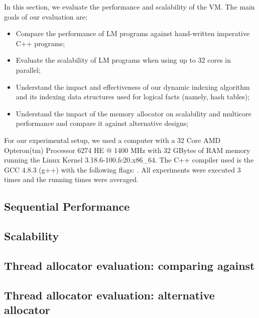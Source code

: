 In this section, we evaluate the performance and scalability of the VM. The main
goals of our evaluation are:

\begin{itemize}
   \item Compare the performance of LM programs against hand-written
      imperative C++ programs;
   \item Evaluate the scalability of LM programs when using up to 32 cores
      in parallel;
   \item Understand the impact and effectiveness of our dynamic indexing
      algorithm and its indexing data structures used for logical facts (namely,
      hash tables);
   \item Understand the impact of the memory allocator on scalability and
      multicore performance and compare it against alternative designs;
\end{itemize}

For our experimental setup, we used a computer with a 32 Core AMD
Opteron(tm) Processor 6274 HE $@$ 1400 MHz with 32 GBytes of RAM memory running
the Linux Kernel 3.18.6-100.fc20.x86\_64. The C++ compiler used is the GCC
4.8.3 (g++) with the following  flags: .  All experiments were executed 3 times and the running times
were averaged.

\subsection{Sequential Performance}\label{section:implementation:performance}


\subsection{Scalability}


\clearpage

\subsection{Thread allocator evaluation: comparing against }


\subsection{Thread allocator evaluation: alternative allocator}\label{section:implementation:alternative_allocator}

